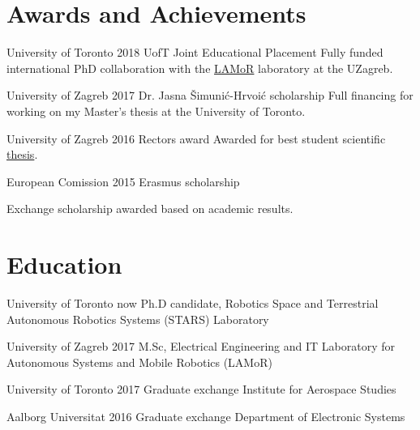 \documentclass{tccv}
\begin{document}
\section{Awards and Achievements}
\begin{yearlist}
\item[University of Toronto]{2018}
     {UofT Joint Educational Placement}
     {{\small Fully funded international PhD collaboration with the \href{https://lamor.fer.hr/}{LAMoR} laboratory at the UZagreb.}}
     
\item[University of Zagreb]{2017}
     {Dr. Jasna Šimunić-Hrvoić scholarship}
     {{\small Full financing for working on my Master's thesis at the University of Toronto.}}

\item[University of Zagreb]{2016}
     {Rectors award}
     {{\small Awarded for best student scientific \href{https://www.dropbox.com/s/k66438qy0xz13c4/rektorova.pdf?dl=0}{thesis}.}}

     
\item[European Comission]{2015}
     {Erasmus scholarship}
     {\begin{small}
     Exchange scholarship awarded based on academic results.
     \end{small}}
\end{yearlist}

\section{Education}
\begin{yearlist}
\item[University of Toronto]{now}
     {Ph.D candidate, Robotics}
     {{\small Space and Terrestrial Autonomous Robotics Systems (STARS) Laboratory }}
\item[University of Zagreb]{2017}
     {M.Sc, Electrical Engineering and IT}
     {{\small Laboratory for Autonomous Systems and Mobile Robotics (LAMoR)}}
\item[University of Toronto]{2017} 
     {Graduate exchange}
     {{\small Institute for Aerospace Studies}}
\item[Aalborg Universitat]{2016}
     {Graduate exchange}
     {{\small Department of Electronic Systems}}
\end{yearlist}
\vspace*{-0.5cm}
%
\end{document}
